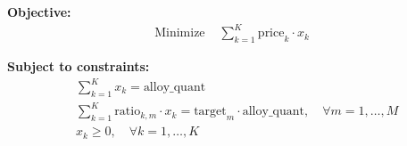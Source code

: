 \documentclass{article}
\begin{document}
\textbf{Objective:}
\begin{align*}
\text{Minimize } & \sum_{k=1}^{K} \text{price}_k \cdot x_k
\end{align*}

\textbf{Subject to constraints:}
\begin{align*}
& \sum_{k=1}^{K} x_k = \text{alloy\_quant} \\
& \sum_{k=1}^{K} \text{ratio}_{k,m} \cdot x_k = \text{target}_m \cdot \text{alloy\_quant}, \quad \forall m = 1, \ldots, M \\
& x_k \geq 0, \quad \forall k = 1, \ldots, K
\end{align*}
\end{document}
